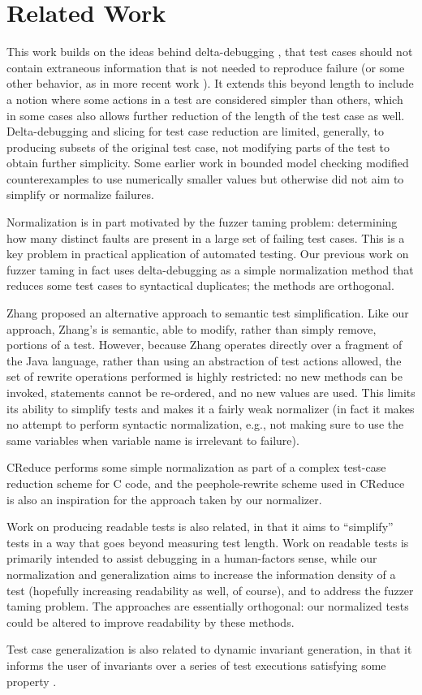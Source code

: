 \section{Related Work}

This work builds on the ideas behind delta-debugging \cite{DD}, that test cases
should not contain extraneous information that is not needed to
reproduce failure (or some other behavior, as in more recent work \cite{icst2014,stvrcausereduce}).  It extends this beyond length to include a notion
where some actions in a test are considered simpler than others, which
in some cases also allows further reduction of the length of the test
case as well.  Delta-debugging and slicing \cite{TCminim} for test case
reduction are limited, generally, to producing subsets of the original
test case, not modifying parts of the test to obtain further
simplicity.  Some earlier work in bounded model checking modified
counterexamples to use numerically smaller values \cite{MakeMost} but
otherwise did not aim to simplify or normalize failures.

Normalization is in part motivated by the fuzzer taming \cite{PLDI13}
problem:  determining how many distinct faults are present in a large
set of failing test cases.  This is a key problem in practical
application of automated testing.  Our previous work on fuzzer taming
in fact uses delta-debugging as a simple normalization method that
reduces some test cases to syntactical duplicates; the methods are orthogonal.

Zhang \cite{SaiSimple} proposed an alternative approach to semantic
test simplification.  Like our approach, Zhang's is semantic, able to
modify, rather than simply remove, portions of a test.  However,
because Zhang operates directly over a fragment of the Java language,
rather than using an abstraction of test actions allowed, the set of
rewrite operations performed is highly restricted:  no new methods can
be invoked, statements cannot be re-ordered, and no new values are
used.  This limits its ability to simplify tests and makes it a fairly
weak normalizer (in fact it makes no attempt to perform syntactic
normalization, e.g., not making sure to use the same variables when
variable name is irrelevant to failure).

CReduce \cite{CReduce} performs some simple normalization as part of a
complex test-case reduction scheme for C code, and the
peephole-rewrite scheme used in CReduce is also an inspiration for the
approach taken by our normalizer.

Work on producing readable tests \cite{Guava,Readable} is also
related, in that it aims to ``simplify'' tests in a way that goes
beyond measuring test length.  Work on readable tests is primarily
intended to assist debugging in a human-factors sense, while our
normalization and generalization aims to increase the information
density of a test (hopefully increasing readability as well, of
course), and to address the fuzzer taming problem.  The approaches are
essentially orthogonal: our normalized tests could be altered to
improve readability by these methods.

Test case generalization is also related to dynamic invariant
generation, in that it informs the user of invariants over a series of
test executions satisfying some property \cite{Daikon}. 
